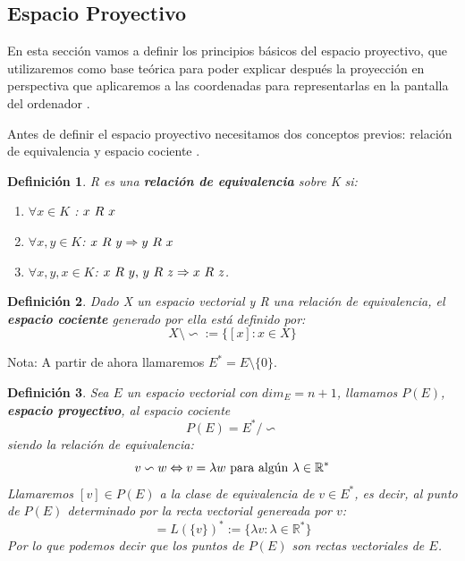 \documentclass[a4paper,11pt, oneside]{book}
\newtheorem{defi}{Definición}
\begin{document}
\subsection{Espacio Proyectivo}

En esta sección vamos a definir los principios básicos del espacio proyectivo, que utilizaremos como base teórica para poder explicar después la proyección en perspectiva que aplicaremos a las coordenadas para representarlas en la pantalla del ordenador \cite{geometria}.


Antes de definir el espacio proyectivo necesitamos dos conceptos previos: relación de equivalencia y espacio cociente \cite{algebra}.

\begin{defi}
	R es una \textbf{relación de equivalencia} sobre K si:
	\begin{enumerate}
	\item $\forall x \in K$	: $x\textup{ }R\textup{ }x$
	\item $\forall x,y \in K$: $x\textup{ }R\textup{ }y \Rightarrow y\textup{ }R\textup{ }x$
	\item $\forall x,y,x \in K$: $x\textup{ }R\textup{ }y \textup{, } y\textup{ }R\textup{ }z \Rightarrow x\textup{ }R\textup{ }z$.
	\end{enumerate}
\end{defi}

\begin{defi}
	Dado X un espacio vectorial y R una relación de equivalencia, el \textbf{espacio cociente} generado por ella está definido por:
	\begin{equation}
		X \setminus \backsim := \{[x]: x \in X\}
	\end{equation}
\end{defi}



Nota: A partir de ahora llamaremos $E^* = E \setminus \{0\}$.
\begin{defi}
	Sea $E$ un espacio vectorial con $dim_E=n+1$, llamamos $P(E)$, \textbf{espacio proyectivo}, al espacio cociente
	\begin{equation}
		P(E) = E^* / \backsim
	\end{equation}
	siendo la relación de equivalencia:
	\begin{equation}
		v \backsim w \Leftrightarrow v = \lambda w \textup{ para algún } \lambda \in \mathbb R^* 
	\end{equation}
	Llamaremos $[v] \in P(E)$ a la clase de equivalencia de $v \in E^*$, es decir, al punto de $P(E)$ determinado por la recta vectorial genereada por $v$:
	\begin{equation}
		[v] = L(\{v\})^* := \{\lambda v: \lambda \in \mathbb R^*\}
	\end{equation}
	Por lo que podemos decir que los puntos de $P(E)$ son rectas vectoriales de $E$.
\end{defi}
\end{document}
